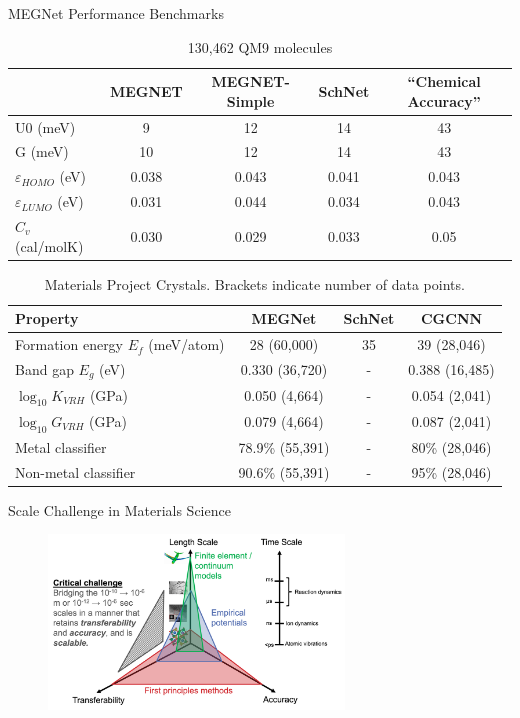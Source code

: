 \documentclass[aspectratio=169]{beamer}
\begin{document}
\begin{frame}{MEGNet Performance Benchmarks}
\footnotesize
    \begin{table}[]
        \centering
        \begin{tabular}{l|c|c|c|c}
& MEGNET & MEGNET-Simple & SchNet & “Chemical Accuracy”\\
\hline
U0 (meV) & 9 & 12 & 14 & 43 \\
G (meV) & 10 & 12 & 14 & 43 \\
$\varepsilon_{HOMO}$ (eV) & 0.038 & 0.043 & 0.041 & 0.043\\
$\varepsilon_{LUMO}$ (eV) & 0.031 & 0.044 & 0.034 & 0.043\\
$C_v$ (cal/molK) & 0.030 & 0.029 & 0.033 & 0.05
        \end{tabular}
        \caption{130,462 QM9 molecules}
    \end{table}
    \begin{table}[]
        \centering
        \begin{tabular}{l|c|c|c}
Property & MEGNet & SchNet & CGCNN\\
\hline
Formation energy $E_f$ (meV/atom) & 28 (60,000) & 35 & 39 (28,046)\\
Band gap $E_g$ (eV) & 0.330 (36,720) & - & 0.388 (16,485)\\
$\log_{10} K_{VRH}$ (GPa) & 0.050 (4,664) & - & 0.054 (2,041)\\
$\log_{10} G_{VRH}$ (GPa) & 0.079 (4,664) & - & 0.087 (2,041)\\
Metal classifier & 78.9\% (55,391) & - & 80\% (28,046)\\
Non-metal classifier & 90.6\% (55,391) & - & 95\% (28,046)
        \end{tabular}
        \caption{Materials Project Crystals. Brackets indicate number of data points.}
    \end{table}
\end{frame}


\begin{frame}{Scale Challenge in Materials Science}
    \begin{figure}
        \centering
        \includegraphics[width=0.7\textwidth]{lectures/slides_tex/figures/scale_challenge.png}
    \end{figure}
\end{frame}
\end{document}
